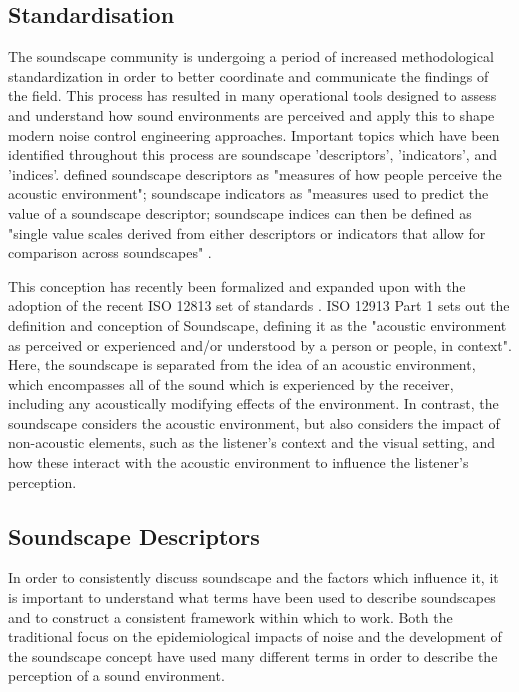 \subsection{Standardisation}
The soundscape community is undergoing a period of increased methodological standardization in order to better coordinate and communicate the findings of the field. This process has resulted in many operational tools designed to assess and understand how sound environments are perceived and apply this to shape modern noise control engineering approaches. Important topics which have been identified throughout this process are soundscape 'descriptors', 'indicators', and 'indices'. \citet{Aletta2016Soundscape} defined soundscape descriptors as "measures of how people perceive the acoustic environment"; soundscape indicators as "measures used to predict the value of a soundscape descriptor; soundscape indices can then be defined as "single value scales derived from either descriptors or indicators that allow for comparison across soundscapes" \citep{Kang2019Towards}.

This conception has recently been formalized and expanded upon with the adoption of the recent ISO 12813 set of standards \citep{ISO12913Part1, ISO12913Part2,ISO12913Part3}. ISO 12913 Part 1 sets out the definition and conception of Soundscape, defining it as the "acoustic environment as perceived or experienced and/or understood by a person or people, in context". Here, the soundscape is separated from the idea of an acoustic environment, which encompasses all of the sound which is experienced by the receiver, including any acoustically modifying effects of the environment. In contrast, the soundscape considers the acoustic environment, but also considers the impact of non-acoustic elements, such as the listener's context and the visual setting, and how these interact with the acoustic environment to influence the listener's perception.

\subsection{Soundscape Descriptors}
In order to consistently discuss soundscape and the factors which influence it, it is important to understand what terms have been used to describe soundscapes and to construct a consistent framework within which to work. Both the traditional focus on the epidemiological impacts of noise and the development of the soundscape concept have used many different terms in order to describe the perception of a sound environment.

